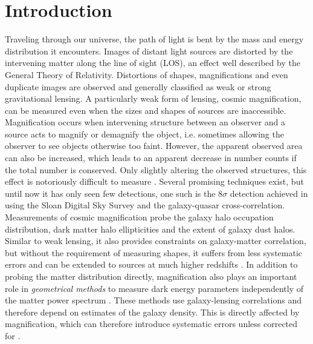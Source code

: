 \documentclass[useAMS,usenatbib]{mnras}
\begin{document}
\section{Introduction}
Traveling through our universe, the path of light is bent by the mass and energy distribution it encounters. Images of distant light sources are distorted by the intervening matter along the line of sight (LOS), an effect well described by the General Theory of Relativity. Distortions of shapes, magnifications and even duplicate images are observed and generally classified as weak or strong gravitational lensing. A particularly weak form of lensing, cosmic magnification, can be measured even when the sizes and shapes of sources are inaccessible. Magnification occurs when intervening structure between an observer and a source acts to magnify or demagnify the object, i.e. sometimes allowing the observer to see objects otherwise too faint. However, the apparent observed area can also be increased, which leads to an apparent decrease in number counts if the total number is conserved. Only slightly altering the observed structures, this effect is notoriously difficult to measure \citep[e.g.][]{2009A&A...507..683H, 0004-637X-814-2-145, 2008PhRvD..78l3517Z, 2006MNRAS.367..169Z}. Several promising techniques exist, but until now it has only seen few detections, one such is the $8\sigma$ detection achieved in \citet{2005ApJ...633..589S} using the Sloan Digital Sky Survey and the galaxy-quasar cross-correlation. Measurements of cosmic magnification probe the galaxy halo occupation distribution, dark matter halo ellipticities and the extent of galaxy dust halos. Similar to weak lensing, it also provides constraints on galaxy-matter correlation, but without the requirement of measuring shapes, it suffers from less systematic errors and can be extended to sources at much higher redshifts \citep{2005ApJ...633..589S}. In addition to probing the matter distribution directly, magnification also plays an important role in \emph{geometrical methods} to measure dark energy parameters independently of the matter power spectrum \citep{2007MNRAS.374.1377T,2004ApJ...600...17B,2003PhRvL..91n1302J}. These methods use galaxy-lensing correlations and therefore depend on estimates of the galaxy density. This is directly affected by magnification, which can therefore introduce systematic errors unless corrected for \citep{2005ApJ...633..589S}.
\end{document}
